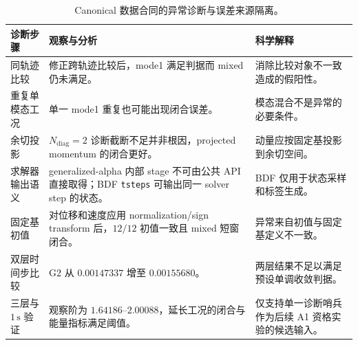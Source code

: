 \begin{table}[!ht]
\centering
\caption{Canonical 数据合同的异常诊断与误差来源隔离。}
\label{tab:canonical-diagnostic-chain}
\scriptsize
\begin{tabularx}{\textwidth}{@{}l>{\raggedright\arraybackslash}X>{\raggedright\arraybackslash}X@{}}
\toprule
诊断步骤 & 观察与分析 & 科学解释 \\
\midrule
同轨迹比较 & 修正跨轨迹比较后，mode1 满足判据而 mixed 仍未满足。 & 消除比较对象不一致造成的假阳性。 \\
重复单模态工况 & 单一 mode1 重复也可能出现闭合误差。 & 模态混合不是异常的必要条件。 \\
余切投影 & \(N_{\mathrm{diag}}=2\) 诊断截断不足并非根因，projected momentum 的闭合更好。 & 动量应按固定基投影到余切空间。 \\
求解器输出语义 & generalized-alpha 内部 stage 不可由公共 API 直接取得；BDF \texttt{tsteps} 可输出同一 solver step 的状态。 & BDF 仅用于状态采样和标签生成。 \\
固定基初值 & 对位移和速度应用 normalization/sign transform 后，\(12/12\) 初值一致且 mixed 短窗闭合。 & 异常来自初值与固定基定义不一致。 \\
双层时间步比较 & G2 从 \(0.00147337\) 增至 \(0.00155680\)。 & 两层结果不足以满足预设单调收敛判据。 \\
三层与 \(1\,\mathrm{s}\) 验证 & 观察阶为 \(1.64186\)--\(2.00088\)，延长工况的闭合与能量指标满足阈值。 & 仅支持单一诊断哨兵作为后续 A1 资格实验的候选输入。 \\
\bottomrule
\end{tabularx}
\end{table}
